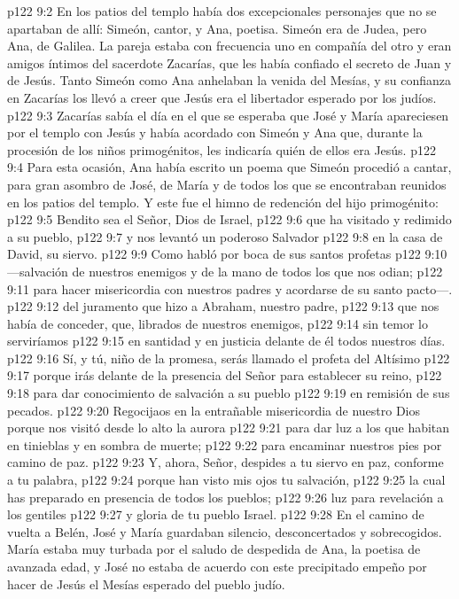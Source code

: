 \vs p122 9:2 \pc En los patios del templo había dos excepcionales personajes que no se apartaban de allí: Simeón, cantor, y Ana, poetisa. Simeón era de Judea, pero Ana, de Galilea. La pareja estaba con frecuencia uno en compañía del otro y eran amigos íntimos del sacerdote Zacarías, que les había confiado el secreto de Juan y de Jesús. Tanto Simeón como Ana anhelaban la venida del Mesías, y su confianza en Zacarías los llevó a creer que Jesús era el libertador esperado por los judíos.
\vs p122 9:3 Zacarías sabía el día en el que se esperaba que José y María apareciesen por el templo con Jesús y había acordado con Simeón y Ana que, durante la procesión de los niños primogénitos, les indicaría quién de ellos era Jesús.
\vs p122 9:4 Para esta ocasión, Ana había escrito un poema que Simeón procedió a cantar, para gran asombro de José, de María y de todos los que se encontraban reunidos en los patios del templo. Y este fue el himno de redención del hijo primogénito:
\vs p122 9:5 Bendito sea el Señor, Dios de Israel,
\vs p122 9:6 que ha visitado y redimido a su pueblo,
\vs p122 9:7 y nos levantó un poderoso Salvador
\vs p122 9:8 en la casa de David, su siervo.
\vs p122 9:9 Como habló por boca de sus santos profetas
\vs p122 9:10 ---salvación de nuestros enemigos y de la mano de todos los que nos odian;
\vs p122 9:11 para hacer misericordia con nuestros padres y acordarse de su santo pacto---.
\vs p122 9:12 del juramento que hizo a Abraham, nuestro padre,
\vs p122 9:13 que nos había de conceder, que, librados de nuestros enemigos,
\vs p122 9:14 sin temor lo serviríamos
\vs p122 9:15 en santidad y en justicia delante de él todos nuestros días.
\vs p122 9:16 Sí, y tú, niño de la promesa, serás llamado el profeta del Altísimo
\vs p122 9:17 porque irás delante de la presencia del Señor para establecer su reino,
\vs p122 9:18 para dar conocimiento de salvación a su pueblo
\vs p122 9:19 en remisión de sus pecados.
\vs p122 9:20 Regocijaos en la entrañable misericordia de nuestro Dios porque nos visitó desde lo alto la aurora
\vs p122 9:21 para dar luz a los que habitan en tinieblas y en sombra de muerte;
\vs p122 9:22 para encaminar nuestros pies por camino de paz.
\vs p122 9:23 Y, ahora, Señor, despides a tu siervo en paz, conforme a tu palabra,
\vs p122 9:24 porque han visto mis ojos tu salvación,
\vs p122 9:25 la cual has preparado en presencia de todos los pueblos;
\vs p122 9:26 luz para revelación a los gentiles
\vs p122 9:27 y gloria de tu pueblo Israel.
\vs p122 9:28 \pc En el camino de vuelta a Belén, José y María guardaban silencio, desconcertados y sobrecogidos. María estaba muy turbada por el saludo de despedida de Ana, la poetisa de avanzada edad, y José no estaba de acuerdo con este precipitado empeño por hacer de Jesús el Mesías esperado del pueblo judío.
